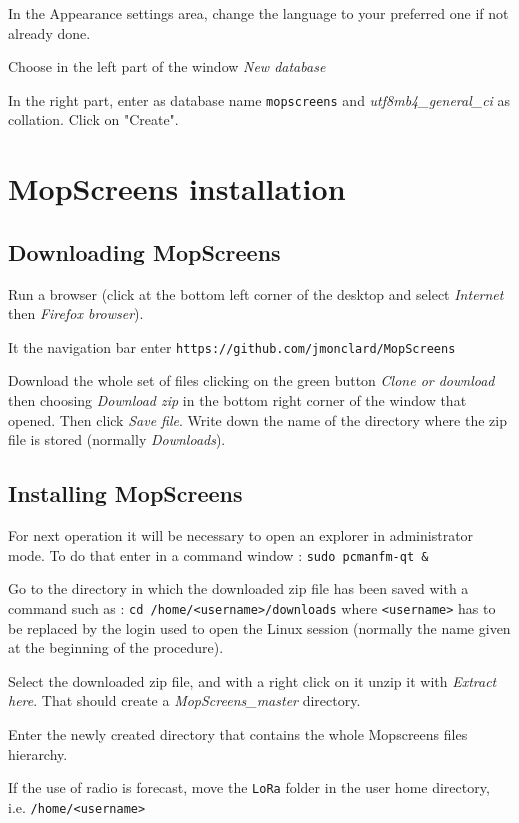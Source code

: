 \documentclass[a4paper]{ffco-rapport}
\begin{document}
			In the \og{}Appearance settings\fg{} area, change the language to your preferred one if not already done.
			
			Choose in the left part of the window \emph{New database}

			In the right part, enter as database name \verb|mopscreens| and \emph{utf8mb4\_general\_ci} as collation. Click on "Create".

\section{MopScreens installation}

	\subsection{Downloading MopScreens}
			Run a browser (click at the bottom left corner of the desktop and select \emph{Internet} then \emph{Firefox browser}).

			It the navigation bar enter \verb|https://github.com/jmonclard/MopScreens|
	
			Download the whole set of files clicking on the green button \emph{Clone or download} then choosing \emph{Download zip} in the bottom right corner of the window that opened. Then click \emph{Save file}. Write down the name of the directory where the zip file is stored (normally \emph{Downloads}).
		
	\subsection{Installing MopScreens}
		For next operation it will be necessary to open an explorer in administrator mode.
		To do that enter in a command window : \verb|sudo pcmanfm-qt &|

		Go to the directory in which the downloaded zip file has been saved with a command such as : \verb|cd /home/<username>/downloads| where \verb|<username>| has to be replaced by the login used to open the Linux session (normally the name given at the beginning of the procedure).

		Select the downloaded zip file, and with a right click on it unzip it with \emph{Extract here}. That should create a \emph{MopScreens\_master} directory.
		
		Enter the newly created directory that contains the whole Mopscreens files hierarchy.
		
		If the use of radio is forecast, move the \verb|LoRa| folder in the user home directory, i.e. \verb|/home/<username>|
\end{document}
